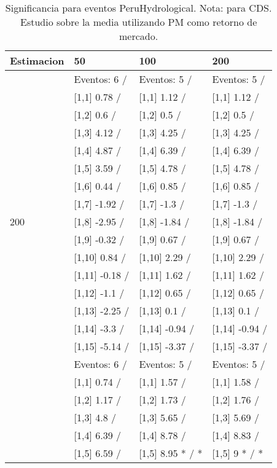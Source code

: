 \begin{table}

\caption{Significancia para eventos PeruHydrological. Nota: para CDS. Estudio sobre la media utilizando PM como retorno de mercado.}
\centering
\begin{tabular}[t]{llll}
\toprule
Estimacion & 50 & 100 & 200\\
\midrule
 & Eventos:  6 / & Eventos:  5 / & Eventos:  5 /\\
 & {}[1,1] 0.78  / & {}[1,1] 1.12  / & {}[1,1] 1.12  /\\
 & {}[1,2] 0.6  / & {}[1,2] 0.5  / & {}[1,2] 0.5  /\\
 & {}[1,3] 4.12  / & {}[1,3] 4.25  / & {}[1,3] 4.25  /\\
 & {}[1,4] 4.87  / & {}[1,4] 6.39  / & {}[1,4] 6.39  /\\
\addlinespace
 & {}[1,5] 3.59  / & {}[1,5] 4.78  / & {}[1,5] 4.78  /\\
 & {}[1,6] 0.44  / & {}[1,6] 0.85  / & {}[1,6] 0.85  /\\
 & {}[1,7] -1.92  / & {}[1,7] -1.3  / & {}[1,7] -1.3  /\\
200 & {}[1,8] -2.95  / & {}[1,8] -1.84  / & {}[1,8] -1.84  /\\
 & {}[1,9] -0.32  / & {}[1,9] 0.67  / & {}[1,9] 0.67  /\\
\addlinespace
 & {}[1,10] 0.84  / & {}[1,10] 2.29  / & {}[1,10] 2.29  /\\
 & {}[1,11] -0.18  / & {}[1,11] 1.62  / & {}[1,11] 1.62  /\\
 & {}[1,12] -1.1  / & {}[1,12] 0.65  / & {}[1,12] 0.65  /\\
 & {}[1,13] -2.25  / & {}[1,13] 0.1  / & {}[1,13] 0.1  /\\
 & {}[1,14] -3.3  / & {}[1,14] -0.94  / & {}[1,14] -0.94  /\\
\addlinespace
 & {}[1,15] -5.14  / & {}[1,15] -3.37  / & {}[1,15] -3.37  /\\
 & Eventos:  6 / & Eventos:  5 / & Eventos:  5 /\\
 & {}[1,1] 0.74  / & {}[1,1] 1.57  / & {}[1,1] 1.58  /\\
 & {}[1,2] 1.17  / & {}[1,2] 1.73  / & {}[1,2] 1.76  /\\
 & {}[1,3] 4.8  / & {}[1,3] 5.65  / & {}[1,3] 5.69  /\\
\addlinespace
 & {}[1,4] 6.39  / & {}[1,4] 8.78  / & {}[1,4] 8.83  /\\
 & {}[1,5] 6.59  / & {}[1,5] 8.95 * / * & {}[1,5] 9 * / *\\

\end{tabular}
\end{table}
